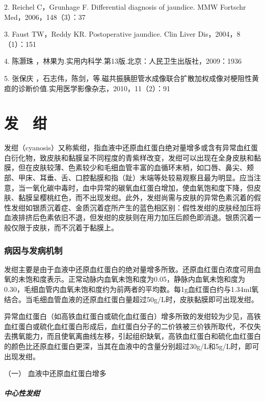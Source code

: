2. Reichel C，Grunhage F. Differential diagnosis of jaundice. MMW
Fortschr Med，2006，148（3）：37

3. Faust TW，Reddy KR. Postoperative jaundice. Clin Liver
Dis，2004，8（1）：151

4. 陈灏珠 ，林果为.实用内科学.第13版.北京：人民卫生出版社，2009：1936

5. 张保庆
，石志伟，陈剑，等.磁共振胰胆管水成像联合扩散加权成像对梗阻性黄疸的诊断价值.实用医学影像杂志，2010，11（2）：91

\protect\hypertarget{text00041.html}{}{}

\chapter{发　绀}

发绀（cyanosis）又称紫绀，指血液中还原血红蛋白绝对量增多或含有异常血红蛋白衍化物，致皮肤和黏膜呈不同程度的青紫样改变，发绀可以出现在全身皮肤和黏膜，但在皮肤较薄、色素较少和毛细血管丰富的血循环末梢，如口唇、鼻尖、颊部、甲床、耳垂、舌、口腔黏膜和指（趾）末端等处较易观察且最为明显。应当注意，当一氧化碳中毒时，血中异常的碳氧血红蛋白增加，使血氧饱和度下降，但皮肤、黏膜呈樱桃红色，而不出现发绀。此外，发绀尚需与皮肤的异常色素沉着的假性发绀如银质沉着症、金质沉着症所产生的蓝色相区别：假性发绀的皮肤经加压将血液排挤后色素依旧不退，但发绀的皮肤则在用力加压后颜色即消退。银质沉着一般仅限于皮肤，而不沉着于黏膜上。

\subsection{病因与发病机制}

发绀主要是由于血液中还原血红蛋白的绝对量增多所致。还原血红蛋白浓度可用血氧的未饱和度表示。正常动脉内血氧未饱和度为0.05，静脉内血氧未饱和度为0.30，毛细血管内血氧未饱和度约为前两者的平均数。每1g血红蛋白约与1.34ml氧结合。当毛细血管血液的还原血红蛋白量超过50g/L时，皮肤黏膜即可出现发绀。

异常血红蛋白（如高铁血红蛋白或硫化血红蛋白）增多所致的发绀较为少见，高铁血红蛋白或硫化血红蛋白形成后，血红蛋白分子的二价铁被三价铁所取代，不仅失去携氧能力，而且使氧离曲线左移，引起组织缺氧，高铁血红蛋白和硫化血红蛋白的颜色比还原血红蛋白更深，当其在血液中的含量分别超过30g/L和5g/L时，即可出现发绀。

\hypertarget{text00041.htmlux5cux23CHP1-17-1-1}{}
（一） 血液中还原血红蛋白增多

\paragraph{中心性发绀}

